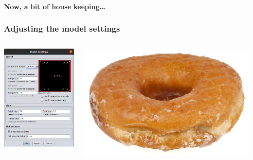 \documentclass[table, 14pt, aspectratio=169]{beamer}
\newcommand{\hl}[1]{\textcolor{OxfordBlue}{\textbf{#1}}}
\begin{document}
\begin{frame}
  \centering\vfill\Large
  \hl{Now, a bit of house keeping\ldots}
  \vfill
\end{frame}

\begin{frame}\frametitle{Adjusting the model settings}
  \begin{columns}
    \begin{column}{0.35\textwidth}
      \includegraphics[width=\textwidth]{images/model_settings.png}
    \end{column}
    \begin{column}{0.65\textwidth}
      \includegraphics[width=\textwidth]{images/Glazed-Donut.jpg}

\end{column}
\end{columns}
\end{frame}
\end{document}
